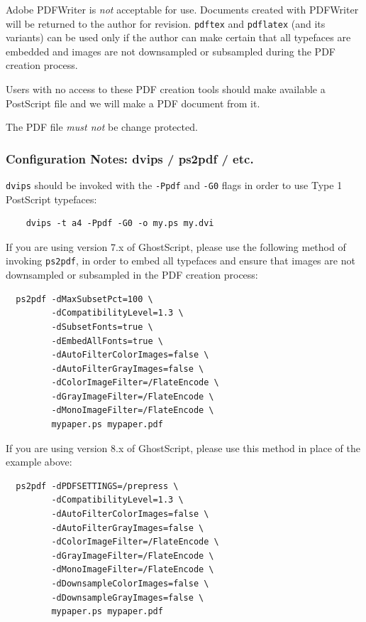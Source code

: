 Adobe PDFWriter is \emph{not} acceptable for use. Documents created with
PDFWriter will be returned to the author for revision. \texttt{pdftex} and
\texttt{pdflatex} (and its variants) can be used only if the author can
make certain that all typefaces are embedded and images are not downsampled
or subsampled during the PDF creation process.

Users with no access to these PDF creation tools should make available a
PostScript file and we will make a PDF document from it.


The PDF file \emph{must not} be change protected.

\subsubsection*{Configuration Notes: dvips / ps2pdf / etc.}

\noindent
\texttt{dvips} should be invoked with the \texttt{-Ppdf} and \texttt{-G0}
flags in order to use Type 1 PostScript typefaces:

\begin{verbatim}
    dvips -t a4 -Ppdf -G0 -o my.ps my.dvi
\end{verbatim}


\noindent
If you are using version 7.x of GhostScript, please use the following method of invoking \texttt{ps2pdf}, in
order to embed all typefaces and ensure that images are not downsampled or subsampled in the PDF
creation process:

\begin{verbatim}
  ps2pdf -dMaxSubsetPct=100 \
         -dCompatibilityLevel=1.3 \
         -dSubsetFonts=true \
         -dEmbedAllFonts=true \
         -dAutoFilterColorImages=false \
         -dAutoFilterGrayImages=false \
         -dColorImageFilter=/FlateEncode \
         -dGrayImageFilter=/FlateEncode \
         -dMonoImageFilter=/FlateEncode \
         mypaper.ps mypaper.pdf
\end{verbatim}


If you are using version 8.x of GhostScript, please use this method in place of the example above:
\begin{verbatim}
  ps2pdf -dPDFSETTINGS=/prepress \
         -dCompatibilityLevel=1.3 \
         -dAutoFilterColorImages=false \
         -dAutoFilterGrayImages=false \
         -dColorImageFilter=/FlateEncode \
         -dGrayImageFilter=/FlateEncode \
         -dMonoImageFilter=/FlateEncode \
         -dDownsampleColorImages=false \
         -dDownsampleGrayImages=false \
         mypaper.ps mypaper.pdf
\end{verbatim}

